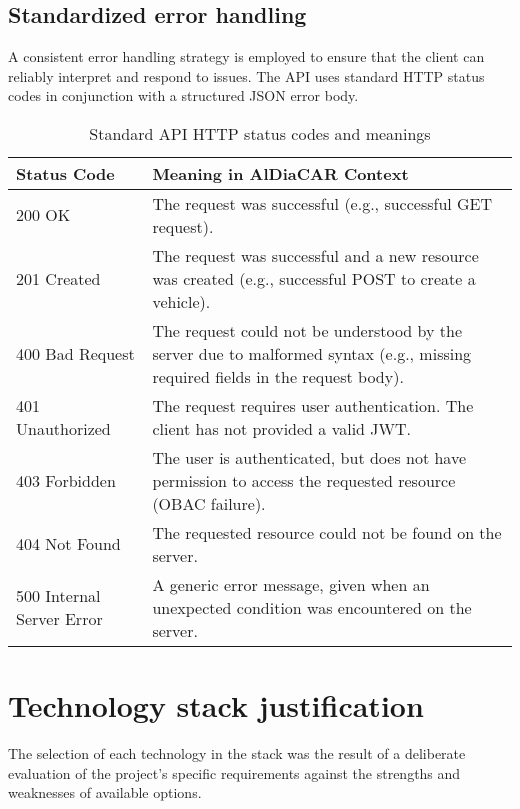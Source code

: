 \subsection{Standardized error handling}
A consistent error handling strategy is employed to ensure that the client can reliably interpret and respond to issues. The API uses standard HTTP status codes in conjunction with a structured JSON error body.

\begin{table}[h!]
    \centering
    \caption{Standard API HTTP status codes and meanings}
    \begin{tabular}{l|p{}}
        \hline
        \textbf{Status Code} & \textbf{Meaning in AlDiaCAR Context} \\
        \hline
        200 OK & The request was successful (e.g., successful GET request). \\
        \hline
        201 Created & The request was successful and a new resource was created (e.g., successful POST to create a vehicle). \\
        \hline
        400 Bad Request & The request could not be understood by the server due to malformed syntax (e.g., missing required fields in the request body). \\
        \hline
        401 Unauthorized & The request requires user authentication. The client has not provided a valid JWT. \\
        \hline
        403 Forbidden & The user is authenticated, but does not have permission to access the requested resource (OBAC failure). \\
        \hline
        404 Not Found & The requested resource could not be found on the server. \\
        \hline
        500 Internal Server Error & A generic error message, given when an unexpected condition was encountered on the server. \\
        \hline
    \end{tabular}
\end{table}

\section{Technology stack justification}

The selection of each technology in the stack was the result of a deliberate evaluation of the project's specific requirements against the strengths and weaknesses of available options.

